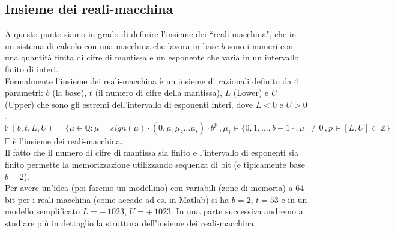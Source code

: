 \subsection{Insieme dei reali-macchina}
A questo punto siamo in grado di definire l'insieme dei ``reali-macchina", che in un sistema di calcolo con una macchina che lavora in base $b$ sono i numeri con una quantità finita di cifre di mantissa e un esponente che varia in un intervallo finito di interi. \\
Formalmente l'insieme dei reali-macchina è un insieme di razionali definito da 4 parametri: $b$ (la base), $t$ (il numero di cifre della mantissa), $L$ (Lower) e $U$ (Upper) che sono gli estremi dell'intervallo di esponenti interi, dove $L < 0$ e $U > 0$.
\[ \mathbb{F} (b, t, L, U) = \{ \mu \in \mathbb{Q} \colon \mu = sign(\mu)\cdot(0,\mu_1 \mu_2 \dotsc \mu_t) \cdot b^p \,, \mu_j \in \{0, 1, \dotsc , b-1\} \,, \mu_1 \ne 0 \,, p \in [L,U] \subset \mathbb{Z} \} \]
$\mathbb{F}$ è l'insieme dei reali-macchina.\\
Il fatto che il numero di cifre di mantissa sia finito e l'intervallo di esponenti sia finito permette la memorizzazione utilizzando sequenza di bit (e tipicamente base $b=2$). \\
Per avere un'idea (poi faremo un modellino) con variabili (zone di memoria) a 64 bit per i reali-macchina (come accade ad es. in Matlab) si ha $b=2$, $t=53$ e in un modello semplificato $L=-\,1023$, $U=+\,1023$. In una parte successiva andremo a studiare più in dettaglio la struttura dell'insieme dei reali-macchina.

